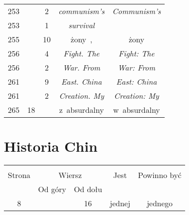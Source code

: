 \documentclass[a4paper,11pt]{article}
\begin{document}
\begin{center}
\begin{tabular}{|c|c|c|c|c|}
    253 & &  2 & \emph{communism's} & \emph{Communism's} \\
    253 & &  1 & \emph{survival} & \\
    255 & & 10 & żony~, & żony \\
    256 & &  4 & \emph{Fight. The} & \emph{Fight: The} \\
    256 & &  2 & \emph{War. From} & \emph{War: From} \\
    261 & &  9 & \emph{East. China} & \emph{East: China} \\
    261 & &  2 & \emph{Creation. My} & \emph{Creation: My} \\
    265 & 18 & & z~absurdalny & w~absurdalny \\
    \hline
  \end{tabular}
\end{center}











\newpage
\section{Historia Chin}

\vspace{\spaceTwo}







\begin{center}
  \begin{tabular}{|c|c|c|c|c|}
    \hline
    & \multicolumn{2}{c|}{} & & \\
    Strona & \multicolumn{2}{c|}{Wiersz} & Jest
                              & Powinno być \\ \cline{2-3}
    & Od góry & Od dołu & & \\
    \hline
    8   & & 16 & jednej & jednego \\
    \hline
  \end{tabular}
\end{center}
\end{document}
